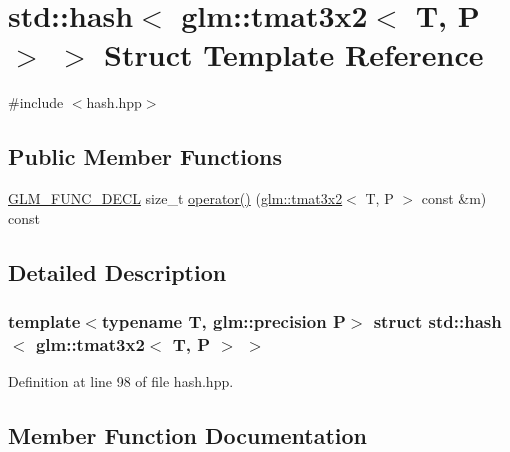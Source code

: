 \hypertarget{structstd_1_1hash_3_01glm_1_1tmat3x2_3_01_t_00_01_p_01_4_01_4}{}\section{std\+::hash$<$ glm\+::tmat3x2$<$ T, P $>$ $>$ Struct Template Reference}
\label{structstd_1_1hash_3_01glm_1_1tmat3x2_3_01_t_00_01_p_01_4_01_4}


{\ttfamily \#include $<$hash.\+hpp$>$}

\subsection*{Public Member Functions}
\begin{DoxyCompactItemize}
\item 
\mbox{\hyperlink{setup_8hpp_ab2d052de21a70539923e9bcbf6e83a51}{G\+L\+M\+\_\+\+F\+U\+N\+C\+\_\+\+D\+E\+CL}} size\+\_\+t \mbox{\hyperlink{structstd_1_1hash_3_01glm_1_1tmat3x2_3_01_t_00_01_p_01_4_01_4_a939aa5ed3298c57a32d1d52c796505a9}{operator()}} (\mbox{\hyperlink{structglm_1_1tmat3x2}{glm\+::tmat3x2}}$<$ T, P $>$ const \&m) const
\end{DoxyCompactItemize}


\subsection{Detailed Description}
\subsubsection*{template$<$typename T, glm\+::precision P$>$\newline
struct std\+::hash$<$ glm\+::tmat3x2$<$ T, P $>$ $>$}



Definition at line 98 of file hash.\+hpp.



\subsection{Member Function Documentation}
\mbox{\label{structstd_1_1hash_3_01glm_1_1tmat3x2_3_01_t_00_01_p_01_4_01_4_a939aa5ed3298c57a32d1d52c796505a9}} 
